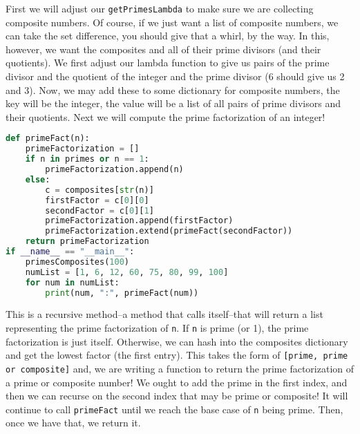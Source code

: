 \documentclass[12pt, twoside, reqno]{book}
\begin{document}
First we will adjust our \texttt{getPrimesLambda} to make sure we are collecting composite numbers. Of course, if we just want a list of composite numbers, we can take the set difference, you should give that a whirl, by the way. In this, however, we want the composites and all of their prime divisors (and their quotients). We first adjust our lambda function to give us pairs of the prime divisor and the quotient of the integer and the prime divisor (6 should give us 2 and 3). Now, we may add these to some dictionary for composite numbers, the key will be the integer, the value will be a list of all pairs of prime divisors and their quotients. Next we will compute the prime factorization of an integer!
\begin{lstlisting}[language=Python]
def primeFact(n):
    primeFactorization = []
    if n in primes or n == 1:
        primeFactorization.append(n)
    else:
        c = composites[str(n)]
        firstFactor = c[0][0]
        secondFactor = c[0][1]
        primeFactorization.append(firstFactor)
        primeFactorization.extend(primeFact(secondFactor))
    return primeFactorization
if __name__ == "__main__":
    primesComposites(100)
    numList = [1, 6, 12, 60, 75, 80, 99, 100]
    for num in numList:
        print(num, ":", primeFact(num))
\end{lstlisting}

This is a recursive method--a method that calls itself--that will return a list representing the prime factorization of \texttt{n}. If \texttt{n} is prime (or 1), the prime factorization is just itself. Otherwise, we can hash into the composites dictionary and get the lowest factor (the first entry). This takes the form of \texttt{[prime, prime or composite]} and, we are writing a function to return the prime factorization of a prime or composite number! We ought to add the prime in the first index, and then we can recurse on the second index that may be prime or composite! It will continue to call \texttt{primeFact} until we reach the base case of \texttt{n} being prime. Then, once we have that, we return it.
\end{document}
